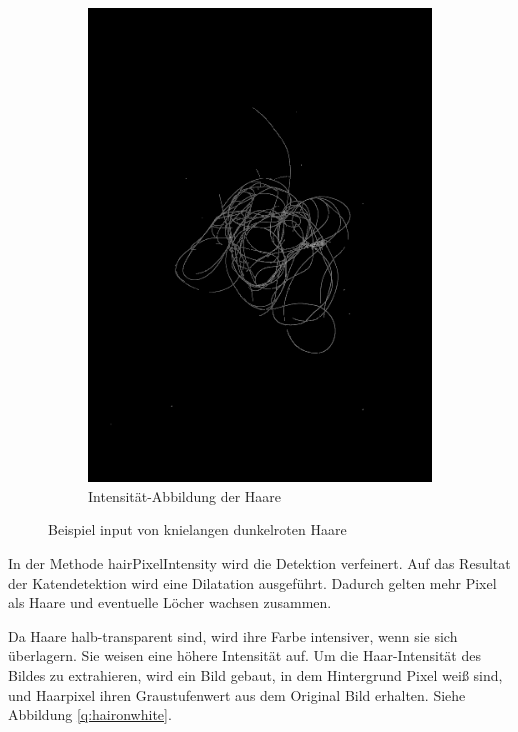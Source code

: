 \documentclass[german,a4paper, 12pt]{scrartcl}
\begin{document}
\begin{figure}
\begin{subfigure}[b]{0.475\textwidth}
		\includegraphics[width=\textwidth]{fig64/05intenstiy.png}
		\caption[]{Intensität-Abbildung der Haare}
		\label{img:Intensity}
	\end{subfigure}
	\caption[  ]
	{\small Beispiel input von knielangen dunkelroten Haare} 
	\label{img:tstM}
\end{figure}


In der Methode hairPixelIntensity wird die Detektion verfeinert.
Auf das Resultat der Katendetektion wird eine Dilatation ausgeführt. Dadurch gelten mehr Pixel als Haare und eventuelle Löcher wachsen zusammen.

Da Haare halb-transparent sind, wird ihre Farbe intensiver, wenn sie sich überlagern. Sie weisen eine höhere Intensität auf.
Um die Haar-Intensität des Bildes zu extrahieren, wird ein Bild gebaut, in dem Hintergrund Pixel weiß sind, und Haarpixel ihren Graustufenwert aus dem Original Bild erhalten. Siehe Abbildung \ref{q:haironwhite}.
\end{document}
